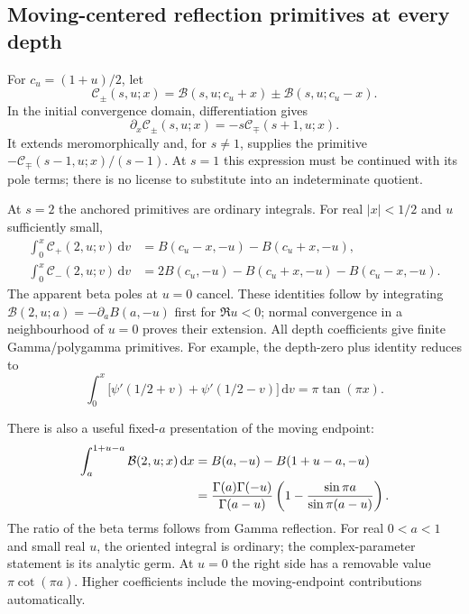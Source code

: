 \documentclass[11pt]{article}
\numberwithin{equation}{section}
\theoremstyle{definition}\newtheorem{definition}[theorem]{Definition}
\theoremstyle{remark}\newtheorem{remark}[theorem]{Remark}
\newcommand{\Bcal}{\mathcal B}
\newcommand{\Ccal}{\mathcal C}
\newcommand{\dd}{\,\mathrm d}
\begin{document}
\subsection{Moving-centered reflection primitives at every depth}

For $c_u=(1+u)/2$, let
\[
 \Ccal_\pm(s,u;x)=\Bcal(s,u;c_u+x)\pm\Bcal(s,u;c_u-x).
\]
In the initial convergence domain, differentiation gives
\begin{equation}\label{agrc:parity-derivatives}
 \partial_x\Ccal_\pm(s,u;x)=-s\Ccal_\mp(s+1,u;x).
\end{equation}
It extends meromorphically and, for $s\ne1$, supplies the primitive
$-\Ccal_\mp(s-1,u;x)/(s-1)$. At $s=1$ this expression must be continued
with its pole terms; there is no license to substitute into an
indeterminate quotient.

At $s=2$ the anchored primitives are ordinary integrals. For real
$|x|<1/2$ and $u$ sufficiently small,
\begin{align}
 \int_0^x\Ccal_+(2,u;v)\dd v
   &=B(c_u-x,-u)-B(c_u+x,-u),\label{agrc:primitive-plus}\\
 \int_0^x\Ccal_-(2,u;v)\dd v
   &=2B(c_u,-u)-B(c_u+x,-u)-B(c_u-x,-u).
 \label{agrc:primitive-minus}
\end{align}
The apparent beta poles at $u=0$ cancel. These identities follow by
integrating $\Bcal(2,u;a)=-\partial_a B(a,-u)$ first for $\Re u<0$;
normal convergence in a neighbourhood of $u=0$ proves their extension.
All depth coefficients give finite Gamma/polygamma primitives.
For example, the depth-zero plus identity reduces to
\begin{equation}\label{agrc:trigamma-primitive}
 \int_0^x\bigl[\psi'(1/2+v)+\psi'(1/2-v)\bigr]\dd v
       =\pi\tan(\pi x).
\end{equation}

There is also a useful fixed-$a$ presentation of the moving endpoint:
\begin{align}
 \int_a^{1+u-a}\Bcal(2,u;x)\dd x
 &=B(a,-u)-B(1+u-a,-u)\notag\\
 &=\frac{\Gamma(a)\Gamma(-u)}{\Gamma(a-u)}
       \left(1-\frac{\sin\pi a}{\sin\pi(a-u)}\right).
 \label{agrc:moving-endpoint}
\end{align}
The ratio of the beta terms follows from Gamma reflection. For real
$0<a<1$ and small real $u$, the oriented integral is ordinary; the
complex-parameter statement is its analytic germ. At $u=0$ the right
side has a removable value $\pi\cot(\pi a)$. Higher coefficients include
the moving-endpoint contributions automatically.
\end{document}
